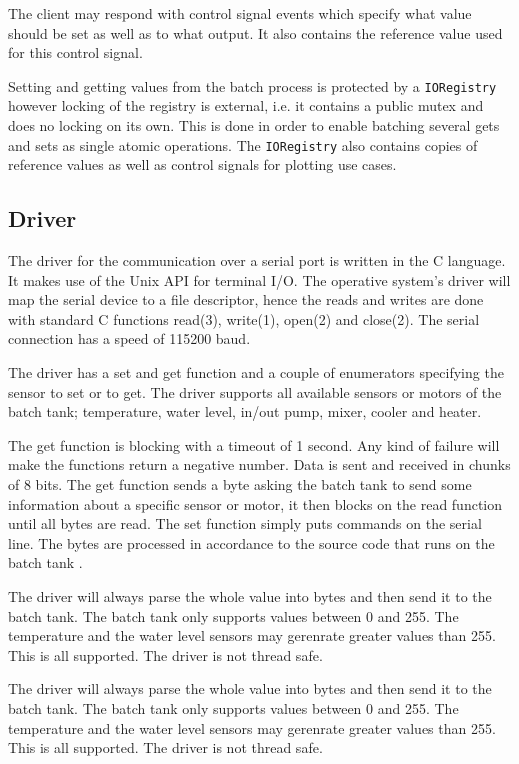\documentclass{article}
\begin{document}
The client may respond with control signal events which specify what
value should be set as well as to what output. It also contains the
reference value used for this control signal.

Setting and getting values from the batch process is protected by a
\verb+IORegistry+ however locking of the registry is external, i.e. it
contains a public mutex and does no locking on its own. This is done in
order to enable batching several gets and sets as single atomic
operations. The \verb+IORegistry+ also contains copies of reference
values as well as control signals for plotting use cases.


\subsection{Driver}
The driver for the communication over a serial port is written in the C language.
It makes use of the Unix API for terminal I/O. The operative system's driver will
map the serial device to a file descriptor, hence the reads and writes are done
with standard C functions read(3), write(1), open(2) and close(2).  The serial
connection has a speed of 115200 baud. 

The driver has a set and get function and a couple of enumerators specifying the
sensor to set or to get. The driver supports all available sensors or motors of
the batch tank; temperature, water level, in/out pump, mixer, cooler and heater.

The get function is blocking with a timeout of 1 second. Any kind of failure will
make the functions return a negative number. Data is sent and received in chunks
of 8 bits. The get function sends a byte asking the batch tank to send some
information about a specific sensor or motor, it then blocks on the read function
until all bytes are read. The set function simply puts commands on the serial
line. The bytes are processed in accordance to the source code that runs on the
batch tank \cite[line 150-223]{kokare.c}. 

The driver will always parse the whole value into bytes and then send it to the
batch tank. The batch tank only supports values between 0 and 255. The
temperature and the water level sensors may gerenrate greater values than 255.
This is all supported. The driver is not thread safe.

The driver will always parse the whole value into bytes and then send it to the
batch tank. The batch tank only supports values between 0 and 255. The
temperature and the water level sensors may gerenrate greater values than 255.
This is all supported. The driver is not thread safe.
\end{document}
